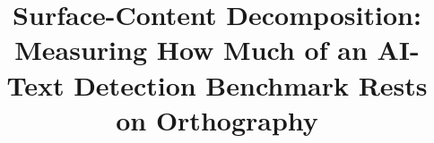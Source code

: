 \documentclass[conference,a4paper]{IEEEtran}
\makeatletter
\newcommand{\linebreakand}{%
  \end{@IEEEauthorhalign}
  \hfill\mbox{}\par
  \mbox{}\hfill\begin{@IEEEauthorhalign}
}
\makeatother
\begin{document}
\title{Surface-Content Decomposition: Measuring How Much of an AI-Text Detection Benchmark Rests on Orthography}


\maketitle
\end{document}
